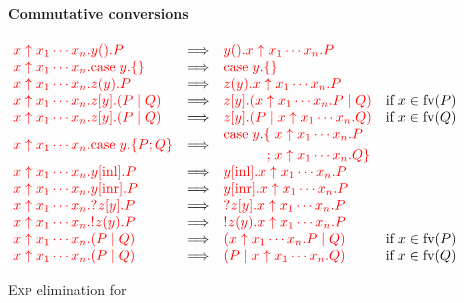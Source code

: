 \begin{figure*}
  \paragraph*{Commutative conversions}
  \(\!
  \begin{array}{lclr}
    \red{ \expn{x}{x_1 \cdots x_n}\wait{y}P }
    &\Longrightarrow&
    \red{ \wait{y}\expn{x}{x_1 \cdots x_n}P }
    \\
    \red{ \expn{x}{x_1\cdots x_n}\case{y}{}{} }
    &\Longrightarrow&
    \red{ \case{y}{}{} }
    \\
    \red{ \expn{x}{x_1 \cdots x_n}\recv{z}{y}P }
    &\Longrightarrow&
    \red{ \recv{z}{y}\expn{x}{x_1 \cdots x_n}P }
    \\
    \red{ \expn{x}{x_1 \cdots x_n}\send{z}{y}(P \mid Q) }
    &\Longrightarrow&
    \red{ \send{z}{y}(\expn{x}{x_1 \cdots x_n}P \mid Q) }
    &\text{if} \; x \in \text{fv}(P)
    \\
    \red{ \expn{x}{x_1 \cdots x_n}\send{z}{y}(P \mid Q) }
    &\Longrightarrow&
    \red{ \send{z}{y}(P \mid \expn{x}{x_1 \cdots x_n}Q) }
    &\text{if} \; x \in \text{fv}(Q) 
    \\
    \red{ \expn{x}{x_1 \cdots x_n}\case{y}{P}{Q} }
    &\Longrightarrow&
    \!\begin{aligned}
      \red{ \text{case}\;y.}
      \red{ \{\;}& \red{\expn{x}{x_1 \cdots x_n}P}\\
      \red{  ;\;}& \red{\expn{x}{x_1 \cdots x_n}Q\}}
    \end{aligned}
    \\
    \red{ \expn{x}{x_1 \cdots x_n}\inl{y}P }
    &\Longrightarrow&
    \red{ \inl{y}\expn{x}{x_1 \cdots x_n}P }
    \\
    \red{ \expn{x}{x_1 \cdots x_n}\inr{y}P }
    &\Longrightarrow&
    \red{ \inr{y}\expn{x}{x_1 \cdots x_n}P }
    \\
    \red{ \expn{x}{x_1 \cdots x_n}\give{\send{z}{y}}P }
    &\Longrightarrow&
    \red{ \give{\send{z}{y}}\expn{x}{x_1 \cdots x_n}P }
    \\
    \red{ \expn{x}{x_1 \cdots x_n}\take{\recv{z}{y}}P }
    &\Longrightarrow&
    \red{ \take{\recv{z}{y}}\expn{x}{x_1 \cdots x_n}P }
    \\
    \red{ \expn{x}{x_1 \cdots x_n}(P \mid Q) }
    &\Longrightarrow&
    \red{ (\expn{x}{x_1 \cdots x_n}P \mid Q) }
    &\text{if} \; x \in \text{fv}(P) 
    \\
    \red{ \expn{x}{x_1 \cdots x_n}(P \mid Q) }
    &\Longrightarrow&
    \red{ (P \mid \expn{x}{x_1 \cdots x_n}Q) }
    &\text{if} \; x \in \text{fv}(Q) 
  \end{array}
  \)
  \caption{\textsc{Exp} elimination for \nodcap}
  \label{fig:nodcap-expn}
\end{figure*}
